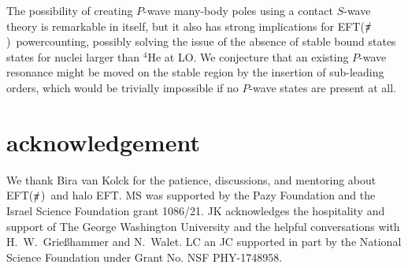 \documentclass[5p,times]{elsarticle}
\newcommand{\eftnopi}{\mbox{EFT($\slashed{\pi}$) }}
\begin{document}
%
The possibility of creating $P$-wave many-body poles using a contact $S$-wave theory is remarkable in itself, but it also has strong implications for \eftnopi powercounting, possibly solving the issue of the absence of stable bound states states for nuclei larger than $^4$He at LO. We conjecture that an existing $P$-wave resonance might be moved on the stable region by the insertion of sub-leading orders, which would be trivially impossible if no $P$-wave states are present at all.

\section*{acknowledgement}
We thank Bira van Kolck for the patience, discussions, and mentoring about \eftnopi and halo EFT. 
MS was supported by the Pazy Foundation and the Israel Science Foundation grant 1086/21.
JK acknowledges the hospitality and support of The George Washington University and the helpful
conversations with H.~W.~Grie\ss hammer and N.~Walet.
LC an JC supported in part by the National Science Foundation under Grant No. NSF PHY-1748958.






\end{document}
